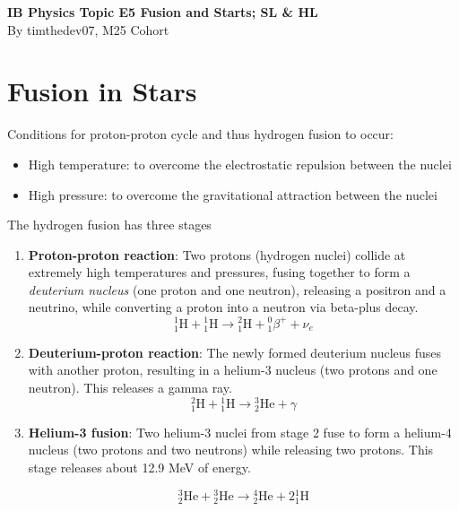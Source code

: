 \documentclass[a4paper,12pt]{article}
\let\oldsection\section
\renewcommand\section{\clearpage\oldsection}
\newcommand{\atom}[3]{{}^{#1}_{#2}\text{#3}}
\begin{document}
\pagestyle{fancy}


\begin{titlepage}
  \begin{center}

    \vspace*{8cm}
    \textbf{\Large {IB Physics Topic E5 Fusion and Starts; SL \& HL}} \\
    \vspace*{1cm}
    \large{By timthedev07, M25 Cohort}

  \end{center}
\end{titlepage}

\pagebreak
\tableofcontents
\pagebreak

\clearpage
\setcounter{page}{1}

\section{Fusion in Stars}

Conditions for proton-proton cycle and thus hydrogen fusion to occur:
\begin{itemize}
  \item High temperature: to overcome the electrostatic repulsion between the nuclei
  \item High pressure: to overcome the gravitational attraction between the nuclei
\end{itemize}

The hydrogen fusion has three stages
\begin{enumerate}
  \item \textbf{Proton-proton reaction}: Two protons (hydrogen nuclei) collide at extremely high temperatures and pressures, fusing together to form a \textit{deuterium nucleus} (one proton and one neutron), releasing a positron and a neutrino, while converting a proton into a neutron via beta-plus decay.
        \[
          \atom{1}{1}{H} + \atom{1}{1}{H} \rightarrow \atom{2}{1}{H} + \atom{0}{1}{$\beta$}^{+} + \nu_e
        \]
  \item \textbf{Deuterium-proton reaction}: The newly formed deuterium nucleus fuses with another proton, resulting in a helium-3 nucleus (two protons and one neutron). This releases a gamma ray.
        \[
          \atom{2}{1}{H} + \atom{1}{1}{H} \rightarrow \atom{3}{2}{He} + \gamma
        \]
  \item \textbf{Helium-3 fusion}: Two helium-3 nuclei from stage 2 fuse to form a helium-4 nucleus (two protons and two neutrons) while releasing two protons. This stage releases about 12.9 MeV of energy.

        \[
          \atom{3}{2}{He} + \atom{3}{2}{He} \rightarrow \atom{4}{2}{He} + 2\atom{1}{1}{H}
        \]
\end{enumerate}
\end{document}
